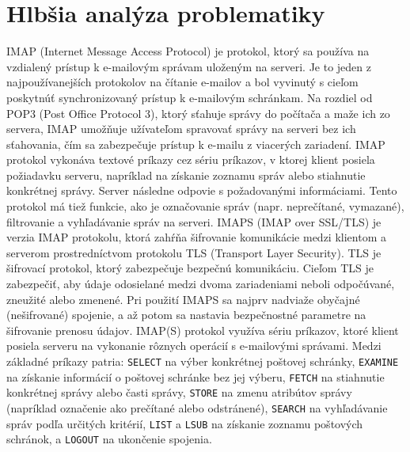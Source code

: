 \documentclass[a4paper, 11pt]{article}
\begin{document}
	\section{Hlbšia analýza problematiky}
	IMAP (Internet Message Access Protocol)\cite{rfc3501} je protokol, ktorý sa používa na vzdialený prístup k e-mailovým správam uloženým na serveri. Je to jeden z najpoužívanejších protokolov na čítanie e-mailov a bol vyvinutý s cieľom poskytnúť synchronizovaný prístup k e-mailovým schránkam. Na rozdiel od POP3 (Post Office Protocol 3), ktorý sťahuje správy do počítača a maže ich zo servera, IMAP umožňuje užívateľom spravovať správy na serveri bez ich sťahovania, čím sa zabezpečuje prístup k e-mailu z viacerých zariadení. \newline
	IMAP protokol vykonáva textové príkazy cez sériu príkazov, v ktorej klient posiela požiadavku serveru, napríklad na získanie zoznamu správ alebo stiahnutie konkrétnej správy. Server následne odpovie s požadovanými informáciami. Tento protokol má tiež funkcie, ako je označovanie správ (napr. neprečítané, vymazané), filtrovanie a vyhľadávanie správ na serveri.\newline
	IMAPS (IMAP over SSL/TLS) je verzia IMAP protokolu, ktorá zahŕňa šifrovanie komunikácie medzi klientom a serverom prostredníctvom protokolu TLS (Transport Layer Security). TLS\cite{rfc5246} je šifrovací protokol, ktorý zabezpečuje bezpečnú komunikáciu. Cieľom TLS je zabezpečiť, aby údaje odosielané medzi dvoma zariadeniami neboli odpočúvané, zneužité alebo zmenené.\newline
	Pri použití IMAPS sa najprv nadviaže obyčajné (nešifrované) spojenie, a až potom sa nastavia bezpečnostné parametre na šifrovanie prenosu údajov. \newline
	IMAP(S) protokol využíva sériu príkazov, ktoré klient posiela serveru na vykonanie rôznych operácií s e-mailovými správami. Medzi základné príkazy patria: \texttt{SELECT} na výber konkrétnej poštovej schránky, \texttt{EXAMINE} na získanie informácií o poštovej schránke bez jej výberu, \texttt{FETCH} na stiahnutie konkrétnej správy alebo časti správy, \texttt{STORE} na zmenu atribútov správy (napríklad označenie ako prečítané alebo odstránené), \texttt{SEARCH} na vyhľadávanie správ podľa určitých kritérií, \texttt{LIST} a \texttt{LSUB} na získanie zoznamu poštových schránok, a \texttt{LOGOUT} na ukončenie spojenia. 
\end{document}

